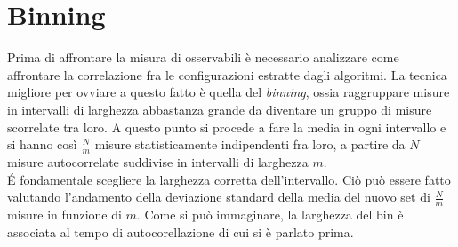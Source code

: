 \section{Binning}
Prima di affrontare la misura di osservabili è necessario analizzare come affrontare la correlazione fra le configurazioni estratte dagli algoritmi.
La tecnica migliore per ovviare a questo fatto è quella del \emph{binning}, ossia raggruppare misure in intervalli di larghezza abbastanza grande da diventare un gruppo di misure scorrelate tra loro.
A questo punto si procede a fare la media in ogni intervallo e si hanno così $\frac{N}{m}$ misure statisticamente indipendenti fra loro, a partire da $N$ misure autocorrelate suddivise in intervalli di larghezza $m$.\\
\'E fondamentale scegliere la larghezza corretta dell'intervallo. Ciò può essere fatto valutando l'andamento
della deviazione standard della media del nuovo set di $\frac{N}{m}$ misure in funzione di $m$.
Come si può immaginare, la larghezza del bin è associata al tempo di autocorellazione di cui si è parlato prima. 

